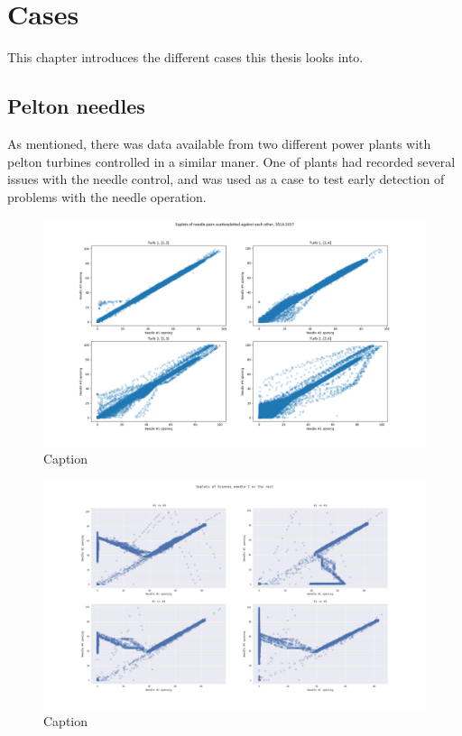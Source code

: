 \chapter{Cases}\label{cha:cases}
This chapter introduces the different cases this thesis looks into. 

\section{Pelton needles}\label{sub:pelton_needles}
    As mentioned, there was data available from two different power plants with pelton turbines controlled in a similar maner. One of plants had recorded several issues with the needle control, and was used as a case to test early detection of problems with the needle operation. 
    
    \begin{figure}
        \centering
        \includegraphics[width=\textwidth]{report/figures/analysis/hjartdola/hjar_scatterplot_all_needels.png}
        \caption{Caption}
        \label{fig:my_label}
    \end{figure}
    
    
    \begin{figure}
        \centering
        \includegraphics[width=\textwidth]{report/figures/analysis/grunnai/grun_scatterplot_1_vs_rest.png}
        \caption{Caption}
        \label{fig:my_label}
    \end{figure}
    
